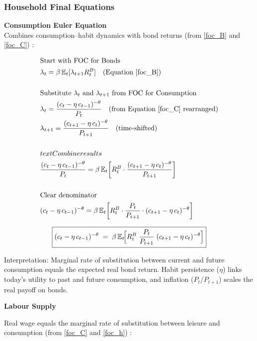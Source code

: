 \documentclass[11pt,preprint]{elsarticle}
\numberwithin{equation}{section}
\numberwithin{figure}{section}
\numberwithin{table}{section}
\begin{document}
\subsubsection{Household Final
Equations}\label{household-final-equations}

\textbf{Consumption Euler Equation}\\
Combines consumption--habit dynamics with bond returns (from
\eqref{foc_B} and \eqref{foc_C}) :

\begin{align*}
& \text{Start with FOC for Bonds} \\
& \lambda_t = \beta\,\mathbb{E}_t[\lambda_{t+1}R_t^B] \quad \text{(Equation \ref{foc_B})} \\
& \\
& \text{Substitute } \lambda_t \text{ and } \lambda_{t+1} \text{ from FOC for Consumption} \\
& \lambda_t = \frac{(c_t - \eta\,c_{t-1})^{-\theta}}{P_t} \quad \text{(from Equation \ref{foc_C} rearranged)} \\
& \lambda_{t+1} = \frac{(c_{t+1} - \eta\,c_t)^{-\theta}}{P_{t+1}} \quad \text{(time-shifted)} \\
& \\
& text{Combine results} \\
& \frac{(c_t - \eta\,c_{t-1})^{-\theta}}{P_t} = \beta\,\mathbb{E}_t\!\left[ R_t^B \cdot \frac{(c_{t+1} - \eta\,c_t)^{-\theta}}{P_{t+1}} \right] \\
& \\
& \text{Clear denominator} \\
& (c_t - \eta\,c_{t-1})^{-\theta} = \beta\,\mathbb{E}_t\!\left[ R_t^B \cdot \frac{P_t}{P_{t+1}} \cdot (c_{t+1} - \eta\,c_t)^{-\theta} \right]
\end{align*}

\begin{equation}\label{consEuler_app}
\boxed{%
  (c_t - \eta\,c_{t-1})^{-\theta}
  \;=\;
  \beta\,\mathbb{E}_t\!\Bigl[
    R_t^B \;\frac{P_t}{P_{t+1}}\;(c_{t+1} - \eta\,c_t)^{-\theta}
  \Bigr]
}
\end{equation}

Interpretation: Marginal rate of substitution between current and future
consumption equals the expected real bond return. Habit persistence
(\(\eta\)) links today's utility to past and future consumption, and
inflation (\(P_t/P_{t+1}\)) scales the real payoff on bonds.

\textbf{Labour Supply}

Real wage equals the marginal rate of substitution between leisure and
consumption (from \eqref{foc_C} and \eqref{foc_h}) :
\end{document}
